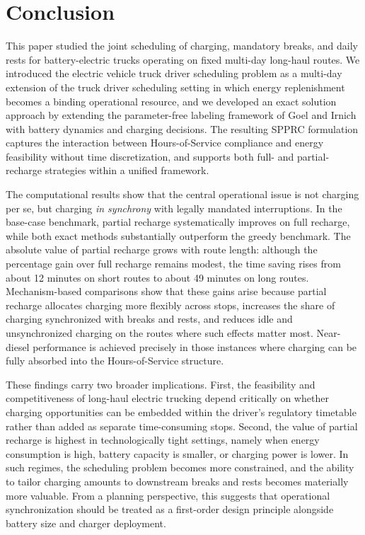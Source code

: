 \documentclass[3p,11pt,authoryear]{elsarticle}  %
\begin{document}
\section{Conclusion}

This paper studied the joint scheduling of charging, mandatory breaks, and daily rests for battery-electric trucks operating on fixed multi-day long-haul routes. We introduced the electric vehicle truck driver scheduling problem as a multi-day extension of the truck driver scheduling setting in which energy replenishment becomes a binding operational resource, and we developed an exact solution approach by extending the parameter-free labeling framework of Goel and Irnich with battery dynamics and charging decisions. The resulting SPPRC formulation captures the interaction between Hours-of-Service compliance and energy feasibility without time discretization, and supports both full- and partial-recharge strategies within a unified framework.

The computational results show that the central operational issue is not charging per se, but charging \emph{in synchrony} with legally mandated interruptions. In the base-case benchmark, partial recharge systematically improves on full recharge, while both exact methods substantially outperform the greedy benchmark. The absolute value of partial recharge grows with route length: although the percentage gain over full recharge remains modest, the time saving rises from about 12 minutes on short routes to about 49 minutes on long routes. Mechanism-based comparisons show that these gains arise because partial recharge allocates charging more flexibly across stops, increases the share of charging synchronized with breaks and rests, and reduces idle and unsynchronized charging on the routes where such effects matter most. Near-diesel performance is achieved precisely in those instances where charging can be fully absorbed into the Hours-of-Service structure. 

These findings carry two broader implications. First, the feasibility and competitiveness of long-haul electric trucking depend critically on whether charging opportunities can be embedded within the driver’s regulatory timetable rather than added as separate time-consuming stops. Second, the value of partial recharge is highest in technologically tight settings, namely when energy consumption is high, battery capacity is smaller, or charging power is lower. In such regimes, the scheduling problem becomes more constrained, and the ability to tailor charging amounts to downstream breaks and rests becomes materially more valuable. From a planning perspective, this suggests that operational synchronization should be treated as a first-order design principle alongside battery size and charger deployment. 
\end{document}
